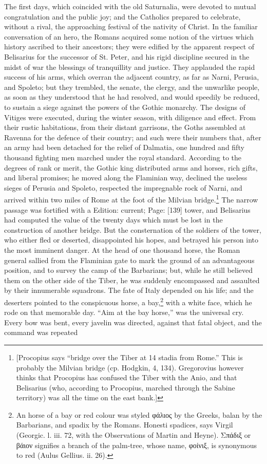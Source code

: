 The first days, which coincided with the old Saturnalia, were devoted to mutual congratulation and the public joy; and the Catholics prepared to celebrate, without a rival, the approaching festival of the nativity of Christ. In the familiar conversation of an hero, the Romans acquired some notion of the virtues which history ascribed to their ancestors; they were edified by the apparent respect of Belisarius for the successor of St. Peter, and his rigid discipline secured in the midst of war the blessings of tranquillity and justice. They applauded the rapid success of his arms, which overran the adjacent country, as far as Narni, Perusia, and Spoleto; but they trembled, the senate, the clergy, and the unwarlike people, as soon as they understood that he had resolved, and would speedily be reduced, to sustain a siege against the powers of the Gothic monarchy. The designs of Vitiges were executed, during the winter season, with diligence and effect. From their rustic habitations, from their distant garrisons, the Goths assembled at Ravenna for the defence of their country; and such were their numbers that, after an army had been detached for the relief of Dalmatia, one hundred and fifty thousand fighting men marched under the royal standard. According to the degrees of rank or merit, the Gothic king distributed arms and horses, rich gifts, and liberal promises; he moved along the Flaminian way, declined the useless sieges of Perusia and Spoleto, respected the impregnable rock of Narni, and arrived within two miles of Rome at the foot of the Milvian bridge.\footnote{[Procopius says \texthebrew{“}bridge over the Tiber at 14 stadia from Rome.\texthebrew{}” This is probably the Milvian bridge (cp. Hodgkin, 4, 134). Gregorovius however thinks that Procopius has confused the Tiber with the Anio, and that Belisarius (who, according to Procopius, marched through the Sabine territory) was all the time on the east bank.]} The narrow passage was fortified with a Edition: current; Page: [139] tower, and Belisarius had computed the value of the twenty days which must be lost in the construction of another bridge. But the consternation of the soldiers of the tower, who either fled or deserted, disappointed his hopes, and betrayed his person into the most imminent danger. At the head of one thousand horse, the Roman general sallied from the Flaminian gate to mark the ground of an advantageous position, and to survey the camp of the Barbarians; but, while he still believed them on the other side of the Tiber, he was suddenly encompassed and assaulted by their innumerable squadrons. The fate of Italy depended on his life; and the deserters pointed to the conspicuous horse, a bay,\footnote{An horse of a bay or red colour was styled \textgreek{φάλιος} by the Greeks, balan by the Barbarians, and spadix by the Romans. Honesti spadices, says Virgil (Georgic. l. iii. 72, with the Observations of Martin and Heyne). \textgreek{Σπάδιξ} or \textgreek{βάιον} signifies a branch of the palm-tree, whose name, \textgreek{φοίνιξ}, is synonymous to red (Aulus Gellius. ii. 26).} with a white face, which he rode on that memorable day. \texthebrew{“}Aim at the bay horse,\texthebrew{}” was the universal cry. Every bow was bent, every javelin was directed, against that fatal object, and the command was repeated 
